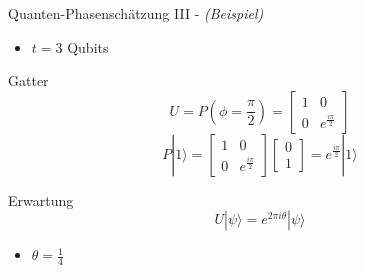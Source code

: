 \documentclass[compress,aspectratio=1610]{beamer}
\begin{document}
\begin{frame}{Quanten-Phasensch\"atzung III - \textit{(Beispiel)}}
  \begin{itemize}
  \item $t = 3$ Qubits
  \end{itemize}
  \begin{block}{Gatter}
    $$U = P\left(\phi = \frac{\pi}{2}\right) =
    \begin{bmatrix}
      1 & 0 \\
      0 & e^{\frac{i\pi}{2}}
    \end{bmatrix}$$
    $$P|1\rangle =
    \begin{bmatrix}
      1 & 0 \\
      0 & e^{\frac{i\pi}{2}}
    \end{bmatrix}
    \begin{bmatrix}
      0 \\ 1
    \end{bmatrix} = e^{\frac{i\pi}{2}}|1\rangle$$
  \end{block}
  \begin{block}{Erwartung}
    $$U|\psi\rangle = e^{2\pi i\theta}|\psi\rangle$$
    \begin{itemize}
    \item $\theta = \frac{1}{4}$
    \end{itemize}
  \end{block}
\end{frame}

\end{document}
